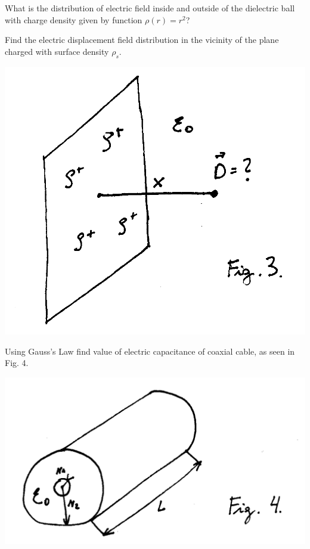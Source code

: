 \begin{Exercise}[difficulty=4]
What is the distribution of electric field inside and outside of the dielectric ball with charge density given by function $\rho(r)= r^2$?
\end{Exercise}


\begin{Exercise}[difficulty=3]
Find the electric displacement field distribution in the vicinity of the plane charged with surface density $\rho_s$.
\begin{center}
\includegraphics[scale=0.3]{img/fig_e3.png} 
\end{center}
\end{Exercise}

\begin{Exercise}[difficulty=2]
Using Gauss's Law find value of electric capacitance of coaxial cable, as seen in Fig. 4.
\begin{center}
\includegraphics[scale=0.3]{img/fig_e4.png} 
\end{center}
\end{Exercise}

